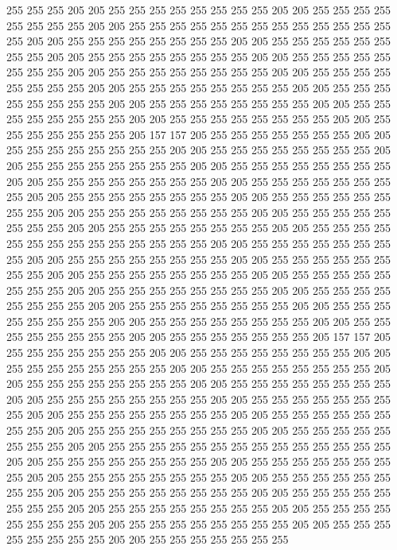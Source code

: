 255 255 255 205 205 255 255 255 255 255 255 255 255 205 205 255 255 255 255 255
255 255 255 205 205 255 255 255 255 255 255 255 255 255 255 255 255 255 255 205
205 255 255 255 255 255 255 255 255 205 205 255 255 255 255 255 255 255 255 205
205 255 255 255 255 255 255 255 255 205 205 255 255 255 255 255 255 255 255 205
205 255 255 255 255 255 255 255 255 205 205 255 255 255 255 255 255 255 255 205
205 255 255 255 255 255 255 255 255 205 205 255 255 255 255 255 255 255 255 205
205 255 255 255 255 255 255 255 255 205 205 255 255 255 255 255 255 255 255 205
205 255 255 255 255 255 255 255 255 205 205 255 255 255 255 255 255 255 205 157
157 205 255 255 255 255 255 255 255 205 205 255 255 255 255 255 255 255 255 205
205 255 255 255 255 255 255 255 255 205 205 255 255 255 255 255 255 255 255 205
205 255 255 255 255 255 255 255 255 205 205 255 255 255 255 255 255 255 255 205
205 255 255 255 255 255 255 255 255 205 205 255 255 255 255 255 255 255 255 205
205 255 255 255 255 255 255 255 255 205 205 255 255 255 255 255 255 255 255 205
205 255 255 255 255 255 255 255 255 205 205 255 255 255 255 255 255 255 255 205
205 255 255 255 255 255 255 255 255 255 255 255 255 255 255 205 205 255 255 255
255 255 255 255 255 205 205 255 255 255 255 255 255 255 255 205 205 255 255 255
255 255 255 255 255 205 205 255 255 255 255 255 255 255 255 205 205 255 255 255
255 255 255 255 255 205 205 255 255 255 255 255 255 255 255 205 205 255 255 255
255 255 255 255 255 205 205 255 255 255 255 255 255 255 255 205 205 255 255 255
255 255 255 255 255 205 205 255 255 255 255 255 255 255 255 205 205 255 255 255
255 255 255 255 255 205 205 255 255 255 255 255 255 255 205 157 157 205 255 255
255 255 255 255 255 205 205 255 255 255 255 255 255 255 255 205 205 255 255 255
255 255 255 255 255 205 205 255 255 255 255 255 255 255 255 205 205 255 255 255
255 255 255 255 255 205 205 255 255 255 255 255 255 255 255 205 205 255 255 255
255 255 255 255 255 205 205 255 255 255 255 255 255 255 255 205 205 255 255 255
255 255 255 255 255 205 205 255 255 255 255 255 255 255 255 205 205 255 255 255
255 255 255 255 255 205 205 255 255 255 255 255 255 255 255 205 205 255 255 255
255 255 255 255 255 255 255 255 255 255 255 205 205 255 255 255 255 255 255 255
255 205 205 255 255 255 255 255 255 255 255 205 205 255 255 255 255 255 255 255
255 205 205 255 255 255 255 255 255 255 255 205 205 255 255 255 255 255 255 255
255 205 205 255 255 255 255 255 255 255 255 205 205 255 255 255 255 255 255 255
255 205 205 255 255 255 255 255 255 255 255 205 205 255 255 255 255 255 255 255
255 205 205 255 255 255 255 255 255 255 255 205 205 255 255 255 255 255 255 255
